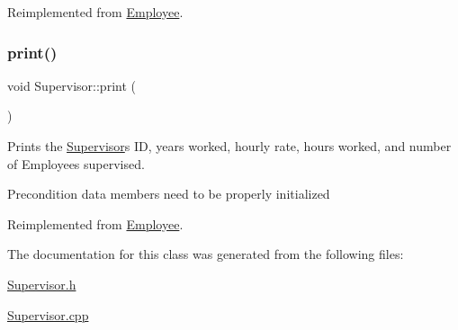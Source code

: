 Reimplemented from \hyperlink{classEmployee_a01c2c44e15434237db28832f6972e960}{Employee}.

\mbox{\label{classSupervisor_a92483dc9a54904d79b46c6ec4efb3f54}} 
\subsubsection{\texorpdfstring{print()}{print()}}
{\footnotesize\ttfamily void Supervisor\+::print (\begin{DoxyParamCaption}{ }\end{DoxyParamCaption})\hspace{0.3cm}{\ttfamily [virtual]}}

Prints the \hyperlink{classSupervisor}{Supervisor}\textquotesingle{}s ID, years worked, hourly rate, hours worked, and number of Employees supervised.

\begin{DoxyPrecond}{Precondition}
data members need to be properly initialized 
\end{DoxyPrecond}


Reimplemented from \hyperlink{classEmployee_a79556ad700627dba88049f487a34a762}{Employee}.



The documentation for this class was generated from the following files\+:\begin{DoxyCompactItemize}
\item 
\hyperlink{Supervisor_8h}{Supervisor.\+h}\item 
\hyperlink{Supervisor_8cpp}{Supervisor.\+cpp}\end{DoxyCompactItemize}
